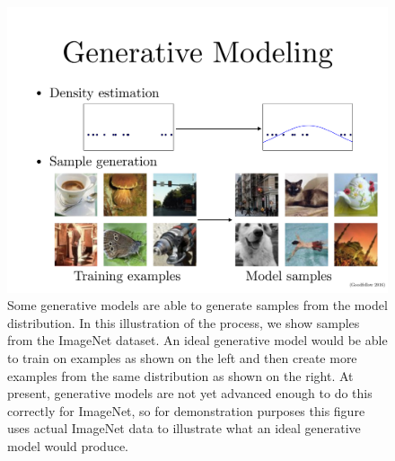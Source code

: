 \begin{figure}
  \center
  \includegraphics[width=\textwidth]{generative_machine.pdf}
  \caption{Some generative models are able to generate samples
    from the model distribution.
    In this illustration of the process, we show samples from
    the ImageNet \citep{imagenet_cvpr09,Deng2010,ILSVRCarxiv14} 
    dataset.
    An ideal generative model would be able to train on examples
    as shown on the left and then create more examples from the
    same distribution as shown on the right.
    At present, generative models are not yet advanced enough to
    do this correctly for ImageNet, so for demonstration purposes
    this figure uses actual ImageNet data to illustrate what an
    ideal generative model would produce.
  }
  \label{fig:generative_machine}
\end{figure}

